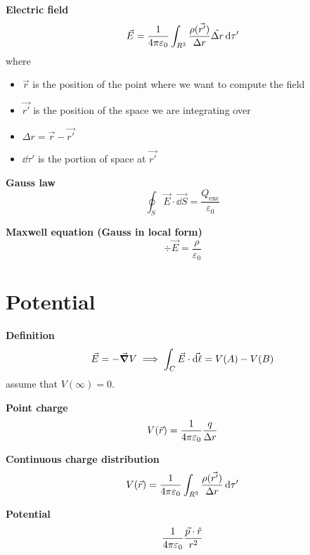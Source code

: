 \documentclass[10pt]{extarticle}
\numberwithin{equation}{section}
\begin{document}
\begin{multicols}{2}
    \textbf{Electric field}
    \begin{equation}
        \vec E =
        \frac{1}{4 \pi \varepsilon_0}
        \int_{R^3} \frac{\rho (\vec{r'})}{\Delta r} \hat{\Delta r} \dd{\tau'}
    \end{equation}
    where
    \begin{itemize}
        \item $\vec r$ is the position of the point where we want to compute the field
        \item $\vec{r'}$ is the position of the space we are integrating over
        \item $\Delta r = \vec r - \vec{r'}$
        \item $\dd \tau'$ is the portion of space at $\vec{r'}$
    \end{itemize}

    \textbf{Gauss law}
    \begin{equation}
        \oint_S \vec E \cdot \vec{\dd S} = \frac{Q_\text{enc}}{\varepsilon_0}
    \end{equation}

    \textbf{Maxwell equation (Gauss in local form)}
    \begin{equation}
        \div \vec E = \frac{\rho}{\varepsilon_0}
    \end{equation}

    \section{Potential}

    \textbf{Definition}
    \begin{equation}
        \vec E = - \grad V \implies \int_C \vec E \cdot \vec{\dd \ell} = V(A) - V(B)
    \end{equation}
    assume that $V(\infty) = 0$.

    \textbf{Point charge}
    \begin{equation}
        V(\vec r) = \frac{1}{4 \pi \varepsilon_0} \frac{q}{\Delta r}
    \end{equation}

    \textbf{Continuous charge distribution}
    \begin{equation}
        V(\vec{r}) = \frac{1}{4 \pi \varepsilon_0} \int_{R^3} \frac{\rho(\vec{r'})}{\Delta r} \dd{\tau'}
    \end{equation}

    \textbf{Potential}
    \begin{equation}
        \frac{1}{4 \pi \varepsilon_0} \frac{\vec p \cdot \hat r}{r^2}
    \end{equation}


\end{multicols}
\end{document}
